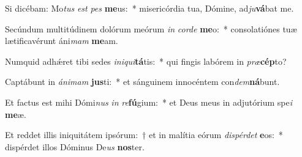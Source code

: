\item Si dicébam: Mo\textit{tus} \textit{est} \textit{pes} \textbf{me}us:~* misericórdia tua, Dómine, ad\textit{ju}\textbf{vá}bat me.
\item Secúndum multitúdinem dolórum meórum \textit{in} \textit{cor}\textit{de} \textbf{me}o:~* consolatiónes tuæ lætificavérunt áni\textit{mam} \textbf{me}am.
\item Numquid adhǽret tibi sedes \textit{in}\textit{i}\textit{qui}\textbf{tá}tis:~* qui fingis labórem in \textit{præ}\textbf{cép}to?
\item Captábunt in \textit{á}\textit{ni}\textit{mam} \textbf{jus}ti:~* et sánguinem innocéntem con\textit{dem}\textbf{ná}bunt.
\item Et factus est mihi Dómi\textit{nus} \textit{in} \textit{re}\textbf{fú}gium:~* et Deus meus in adjutórium spe\textit{i} \textbf{me}æ.
\item Et reddet illis iniquitátem ipsórum:~† et in malítia eórum \textit{dis}\textit{pér}\textit{det} \textbf{e}os:~* dispérdet illos Dóminus De\textit{us} \textbf{nos}ter.

